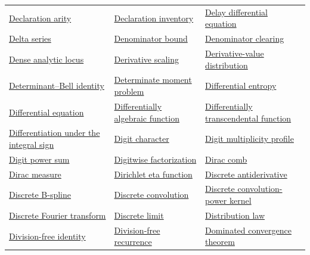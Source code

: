 \documentclass[11pt,oneside]{article}
\begin{document}
\begin{longtable}{L{0.31\textwidth}L{0.31\textwidth}L{0.31\textwidth}}
\hyperlink{gls:declaration-arity}{Declaration arity} & \hyperlink{gls:declaration-inventory}{Declaration inventory} & \hyperlink{gls:delay-differential-equation}{Delay differential equation} \\
\hyperlink{gls:delta-series}{Delta series} & \hyperlink{gls:denominator-bound}{Denominator bound} & \hyperlink{gls:denominator-clearing}{Denominator clearing} \\
\hyperlink{gls:dense-analytic-locus}{Dense analytic locus} & \hyperlink{gls:derivative-scaling}{Derivative scaling} & \hyperlink{gls:derivative-value-distribution}{Derivative-value distribution} \\
\hyperlink{gls:determinant-bell-identity}{Determinant--Bell identity} & \hyperlink{gls:determinate-moment-problem}{Determinate moment problem} & \hyperlink{gls:differential-entropy}{Differential entropy} \\
\hyperlink{gls:differential-equation}{Differential equation} & \hyperlink{gls:differential-algebraic-function}{Differentially algebraic function} & \hyperlink{gls:differentially-transcendental-function}{Differentially transcendental function} \\
\hyperlink{gls:differentiation-under-the-integral-sign}{Differentiation under the integral sign} & \hyperlink{gls:digit-character}{Digit character} & \hyperlink{gls:digit-multiplicity-profile}{Digit multiplicity profile} \\
\hyperlink{gls:digit-power-sum}{Digit power sum} & \hyperlink{gls:digitwise-factorization}{Digitwise factorization} & \hyperlink{gls:dirac-comb}{Dirac comb} \\
\hyperlink{gls:dirac-measure}{Dirac measure} & \hyperlink{gls:dirichlet-eta-function}{Dirichlet eta function} & \hyperlink{gls:discrete-antiderivative}{Discrete antiderivative} \\
\hyperlink{gls:discrete-b-spline}{Discrete B-spline} & \hyperlink{gls:discrete-convolution}{Discrete convolution} & \hyperlink{gls:discrete-convolution-power-kernel}{Discrete convolution-power kernel} \\
\hyperlink{gls:discrete-fourier-transform}{Discrete Fourier transform} & \hyperlink{gls:discrete-limit}{Discrete limit} & \hyperlink{gls:distribution-law}{Distribution law} \\
\hyperlink{gls:division-free-identity}{Division-free identity} & \hyperlink{gls:division-free-recurrence}{Division-free recurrence} & \hyperlink{gls:dominated-convergence-theorem}{Dominated convergence theorem} \\

\end{longtable}
\end{document}
